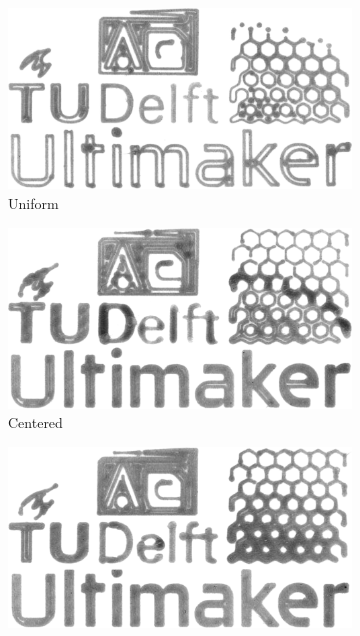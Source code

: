 {\begin{figure}
\centering
\setlength{\figwidth}{0.9\columnwidth}
\begin{subfigure}{\figwidth}\centering
\includegraphics[width=\figwidth]{sources-applications-result-prints-naive-bw.png}
\caption{Uniform}\label{print_naive}
\end{subfigure}
\begin{subfigure}{\figwidth}\centering
\includegraphics[width=\figwidth]{sources-applications-result-prints-center-bw.png}
\caption{Centered}\label{print_center}
\end{subfigure}
\begin{subfigure}{\figwidth}\centering
\includegraphics[width=\figwidth]{sources-applications-result-prints-inward-bw.png}

\end{subfigure}
\end{figure}}
